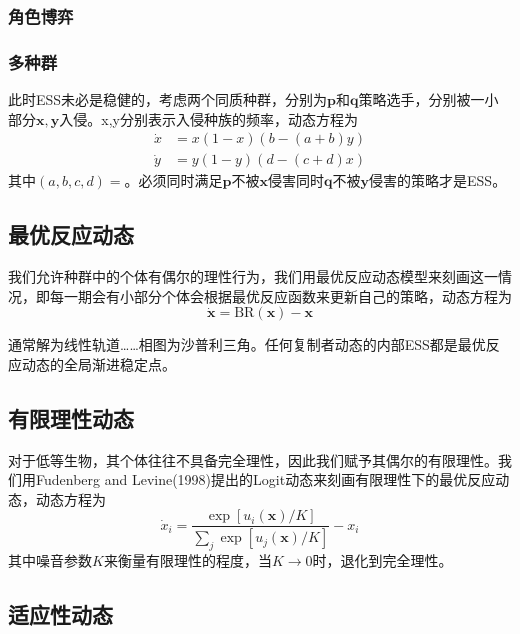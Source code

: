 \documentclass[lang=cn,12pt,a4paper]{elegantpaper}
\begin{document}
\subsubsection{角色博弈}



\subsubsection{多种群}

此时ESS未必是稳健的，考虑两个同质种群，分别为$\mathbf{p}$和$\mathbf{q}$策略选手，分别被一小部分$\mathbf{x},\mathbf{y}$入侵。x,y分别表示入侵种族的频率，动态方程为
\begin{equation}
\begin{aligned}
\dot{x} &=x(1-x)(b-(a+b) y) \\
\dot{y} &=y(1-y)(d-(c+d) x)
\end{aligned}
\end{equation}
其中\((a,b,c,d)=\)。必须同时满足$\mathbf{p}$不被$\mathbf{x}$侵害同时$\mathbf{q}$不被$\mathbf{y}$侵害的策略才是ESS。

\subsection{最优反应动态}

我们允许种群中的个体有偶尔的理性行为，我们用最优反应动态模型来刻画这一情况，即每一期会有小部分个体会根据最优反应函数来更新自己的策略，动态方程为
\begin{equation}
\dot{\mathbf{x}}=\mathrm{BR}(\mathbf{x})-\mathbf{x}
\end{equation}

通常解为线性轨道……相图为沙普利三角。任何复制者动态的内部ESS都是最优反应动态的全局渐进稳定点。

\subsection{有限理性动态}

对于低等生物，其个体往往不具备完全理性，因此我们赋予其偶尔的有限理性。我们用Fudenberg and Levine(1998)提出的Logit动态来刻画有限理性下的最优反应动态，动态方程为
\begin{equation}
\dot{{x}}_{i}=\frac{\exp \left[u_{i}(\mathbf{x}) / K\right]}{\sum_{j} \exp \left[u_{j}(\mathbf{x}) / K\right]}-{x}_i
\end{equation}
其中噪音参数$K$来衡量有限理性的程度，当$K\rightarrow0$时，退化到完全理性。

\subsection{适应性动态}
\end{document}
